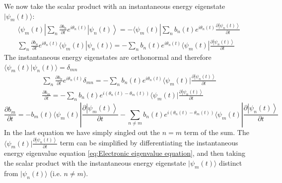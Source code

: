 \documentclass[11pt,a4paper]{article}
\begin{document}
We now take the scalar product with an instantaneous energy eigenstate $|\psi_m(t)\rangle$:
\begin{equation*}
	\begin{gathered}
		\langle \psi_m(t) | \sum_n \frac{\partial b_n}{\partial t} e^{i\theta_n(t)} \left|\psi_n(t)\right\rangle = -\langle \psi_m(t) | \sum_n b_n(t) e^{i\theta_n(t)} \frac{\partial \left|\psi_n(t)\right\rangle}{\partial t} \\[6pt]
		\sum_n \frac{\partial b_n}{\partial t} e^{i\theta_n(t)} \langle \psi_m(t) | \psi_n(t) \rangle = -\sum_n b_n(t) e^{i\theta_n(t)} \langle \psi_m(t) | \frac{\partial \left|\psi_n(t)\right\rangle}{\partial t}
	\end{gathered}
\end{equation*}
The instantaneous energy eigenstates are orthonormal and therefore $\langle \psi_m(t) | \psi_n(t) \rangle = \delta_{mn}$
\begin{equation*}
	\begin{gathered}
		\sum_n \frac{\partial b_n}{\partial t} e^{i\theta_n(t)} \delta_{mn} = -\sum_n b_n(t) e^{i\theta_n(t)} \langle \psi_m(t) | \frac{\partial \left|\psi_n(t)\right\rangle}{\partial t} \\[6pt]
		\frac{\partial b_m}{\partial t} = -\sum_n b_n(t) e^{i(\theta_n(t) - \theta_m(t))} \langle \psi_m(t) | \frac{\partial \left|\psi_n(t)\right\rangle}{\partial t}
	\end{gathered}
\end{equation*}
\begin{equation}
	\label{eq:Coef variation}
	\frac{\partial b_m}{\partial t} = -b_m(t) \langle \psi_m(t) | \frac{\partial \left|\psi_m(t)\right\rangle}{\partial t} - \sum_{n \neq m} b_n(t) e^{i(\theta_n(t) - \theta_m(t))} \langle \psi_m(t) | \frac{\partial \left|\psi_n(t)\right\rangle}{\partial t}
\end{equation}
In the last equation we have simply singled out the $n=m$ term of the sum. The $\langle \psi_m(t) | \frac{\partial \left|\psi_n(t)\right\rangle}{\partial t}$ term can be simplified by differentiating the instantaneous energy eigenvalue equation \eqref{eq:Electronic eigenvalue equation}, and then taking the scalar product with the instantaneous energy eigenstate $|\psi_m(t)\rangle$ distinct from $|\psi_n(t)\rangle$ (i.e. $n\neq m$).
\end{document}
